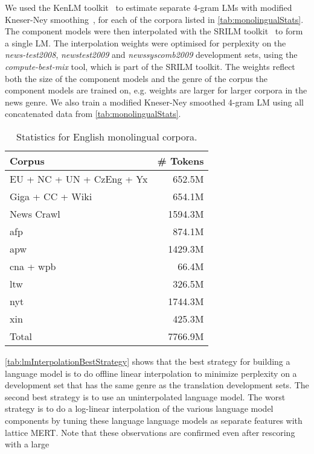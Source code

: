 We used the KenLM toolkit~\citep{heafield-pouzyrevsky-clark-koehn:2013:ACL} to
estimate separate 4-gram LMs with modified Kneser-Ney
smoothing~\citep{kneser-ney:1995:ICASSP,chen-goodman:1998:harvard}, for each of the
corpora listed in \autoref{tab:monolingualStats}. The component models were then
interpolated with the SRILM toolkit~\citep{stolcke:2002:SLP} to form a single LM.
The interpolation weights were optimised for perplexity on the \emph{news-test2008},
\emph{newstest2009} and \emph{newssyscomb2009} development sets, using
the \emph{compute-best-mix} tool, which is part of the SRILM toolkit.
The weights reflect
both the size of the component models and the genre of the corpus the component models
are trained on, e.g. weights are larger for larger corpora in the news genre.
We also train a modified Kneser-Ney smoothed 4-gram LM using
all concatenated data from \autoref{tab:monolingualStats}.
%
\begin{table}[htbp]
\begin{center}
\begin{tabular}{|l|r|}
\hline
Corpus & \# Tokens \\
\hline
EU + NC + UN + CzEng + Yx & 652.5M \\
Giga + CC + Wiki & 654.1M \\
News Crawl & 1594.3M \\
afp & 874.1M \\
apw & 1429.3M \\
cna + wpb & 66.4M \\
ltw & 326.5M \\
nyt & 1744.3M \\
xin & 425.3M \\
\hline
Total & 7766.9M \\
\hline
\end{tabular}
\end{center}
\caption{Statistics for English monolingual corpora.}
\label{tab:monolingualStats}
\end{table}  
%
\autoref{tab:lmInterpolationBestStrategy} shows that the best strategy for
building a language model is to do offline linear interpolation to minimize
perplexity on a development set that has the same genre as the translation
development sets. The second best strategy is to use an uninterpolated
language model. The worst strategy is to do a log-linear interpolation
of the various language model components by tuning these language
language models as separate features with lattice MERT. Note that
these observations are confirmed even after rescoring with a large
